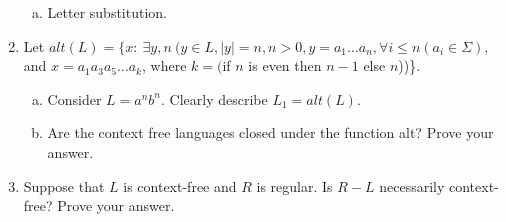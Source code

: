 \documentclass[10pt]{article}
\newcommand{\card}[1]{\left| #1 \right|}
\begin{document}
\begin{enumerate}[1)]
\begin{enumerate}[a)]
\item
Letter substitution.
\end{enumerate}


\item
Let $alt(L) = \{x:\ \exists y, n\ (y \in L, \card{y} = n, n > 0, y = a_1 \ldots a_n, \forall i \leq n (a_i \in \Sigma)$, and $x = a_1a_3a_5\ldots a_k$, where $k = ($if $n$ is even then $n-1$ else $n$))\}.
\begin{enumerate}[a)]
\item
Consider $L = a^nb^n$.  Clearly describe $L_1 = alt(L)$.

\item
Are the context free languages closed under the function alt?  Prove your answer.
\end{enumerate}


\item
Suppose that $L$ is context-free and $R$ is regular.  Is $R - L$ necessarily context-free?  Prove your answer.
\end{enumerate}
\end{document}
